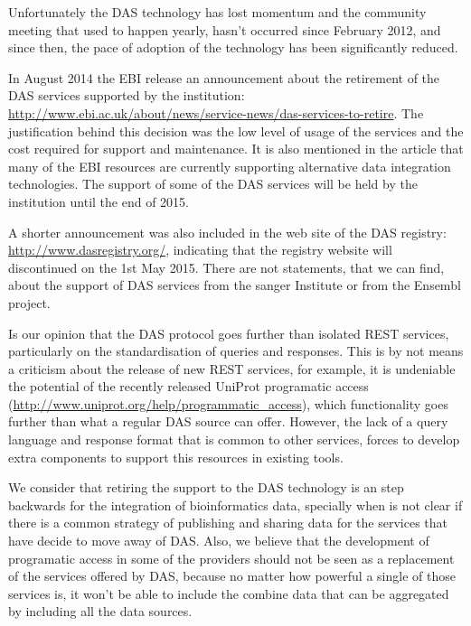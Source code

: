 Unfortunately the DAS technology has lost momentum and the community meeting that used to happen yearly, hasn't occurred since February 2012, and since then, the pace of adoption of the technology has been significantly reduced. 

In August 2014 the EBI release an announcement about the retirement of the DAS services supported by the institution: \url{http://www.ebi.ac.uk/about/news/service-news/das-services-to-retire}. The justification behind this decision was the low level of usage of the services and the cost required for support and maintenance. It is also mentioned in the article that many of the EBI resources are currently supporting alternative data integration technologies. The support of some of the DAS services will be held by the institution until the end of 2015.

A shorter announcement was also included in the web site of the DAS registry: \url{http://www.dasregistry.org/}, indicating that the registry website will discontinued on the 1st May 2015. There are not statements, that we can find, about the support of DAS services from the sanger Institute or from the Ensembl project.

Is our opinion that the DAS protocol goes further than isolated REST services, particularly on the standardisation of queries and responses. This is by not means a criticism about the release of new REST services, for example, it is undeniable the potential of the recently released UniProt programatic access (\url{http://www.uniprot.org/help/programmatic_access}), which functionality goes further than what a regular DAS source can offer. However, the lack of a  query language and response format that is common to other services, forces to develop extra components to support this resources in existing tools. 

We consider that retiring the support to the DAS technology is an step backwards for the integration of bioinformatics data, specially when is not clear if there is a common strategy of publishing and sharing data for the services that have decide to move away of DAS. Also, we believe that the development of programatic access in some of the providers should not be seen as a replacement of the services offered by DAS, because no matter how powerful a single of those services is, it won't be able to include the combine data that can be aggregated by including all the data sources.
